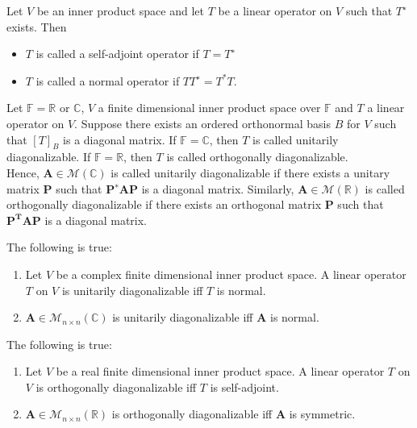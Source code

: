 \documentclass[a4paper]{article}
\begin{document}
\begin{defi}
Let $V$ be an inner product space and let $T$ be a linear operator on $V$ such that $T^∗$ exists. Then
\begin{itemize}
\item $T$ is called a self-adjoint operator if $T = T^∗$
\item $T$ is called a normal operator if $T T^∗ = T^*T$.
\end{itemize}
\end{defi}
\begin{defi}
Let $\mathbb{F}=\mathbb{R}$ or $\mathbb{C}$, $V$ a finite dimensional inner product space over $\mathbb{F}$ and $T$ a linear operator on $V$. Suppose there exists an ordered orthonormal basis $B$ for $V$ such that $[T]_B$ is a diagonal matrix. If $\mathbb{F} = \mathbb{C}$, then $T$ is called unitarily diagonalizable. If $\mathbb{F} = \mathbb{R}$, then $T$ is called orthogonally diagonalizable.\\[5pt]
Hence, $\mathbf{A}\in\mathcal{M}(\mathbb{C})$ is called unitarily diagonalizable if there exists a unitary matrix $\mathbf{P}$ such that $\mathbf{P^∗AP}$ is a diagonal matrix. Similarly, $\mathbf{A}\in\mathcal{M}(\mathbb{R})$ is called orthogonally diagonalizable if there exists an orthogonal matrix $\mathbf{P}$ such that $\mathbf{P^TAP}$ is a diagonal matrix. 
\end{defi}
\begin{thm}
The following is true:
\begin{enumerate}
    \item Let $V$ be a complex finite dimensional inner product space. A linear operator $T$ on $V$ is unitarily diagonalizable iff $T$ is normal.
    \item $\mathbf{A}\in\mathcal{M}_{n\times n}(\mathbb{C})$ is unitarily diagonalizable iff $\mathbf{A}$ is normal.
\end{enumerate}
\end{thm}
\begin{thm}
The following is true:
\begin{enumerate}
    \item Let $V$ be a real finite dimensional inner product space. A linear operator $T$ on $V$ is orthogonally diagonalizable iff $T$ is self-adjoint.
    \item $\mathbf{A}\in\mathcal{M}_{n\times n}(\mathbb{R})$ is orthogonally diagonalizable iff $\mathbf{A}$ is symmetric.
\end{enumerate}
\end{thm}
\end{document}
